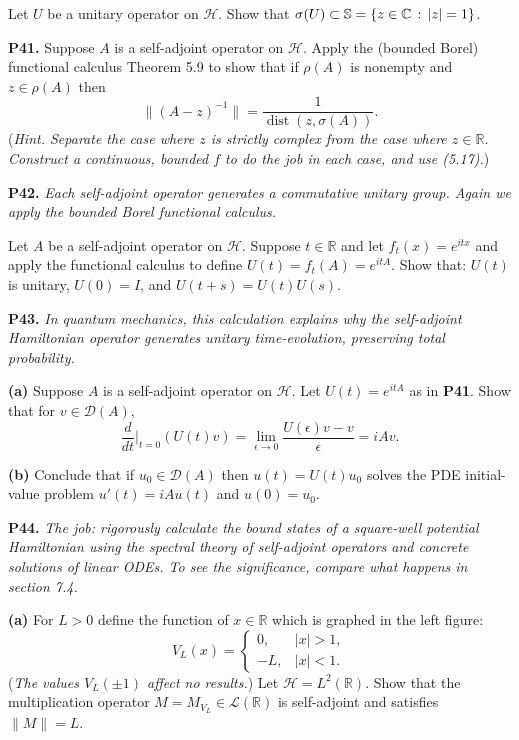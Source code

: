 \documentclass[12pt]{amsart}
\newcommand{\cD}{\mathcal{D}}
\newcommand{\cH}{\mathcal{H}}
\newcommand{\cL}{\mathcal{L}}
\newcommand{\CC}{\mathbb{C}}
\newcommand{\RR}{\mathbb{R}}
\newcommand{\eps}{\epsilon}
\newcommand{\prob}[1]{\bigskip\noindent\textbf{#1.}\quad }
\newcommand{\epart}[1]{\medskip\noindent\textbf{(#1)}\quad }
\begin{document}
\medskip\noindent Let $U$ be a unitary operator on $\cH$.  Show that $\sigma(U) \subset \SS = \{z\in\CC\,:\,|z|=1\}$.


\prob{P41}  Suppose $A$ is a self-adjoint operator on $\cH$.  Apply the (bounded Borel) functional calculus Theorem 5.9 to show that if $\rho(A)$ is nonempty and $z\in\rho(A)$ then
	$$\|(A-z)^{-1}\| = \frac{1}{\operatorname{dist}(z,\sigma(A))}.$$
(\emph{Hint. Separate the case where $z$ is strictly complex from the case where $z\in\RR$.  Construct a continuous, bounded $f$ to do the job in each case, and use (5.17).})


\clearpage\newpage
\prob{P42}  \emph{Each self-adjoint operator generates a commutative unitary group.  Again we apply the bounded Borel functional calculus.}

\medskip\noindent Let $A$ be a self-adjoint operator on $\cH$.  Suppose $t\in\RR$ and let $f_t(x) = e^{itx}$ and apply the functional calculus to define $U(t) = f_t(A) = e^{itA}$.  Show that: $U(t)$ is unitary, $U(0) = I$, and $U(t+s) = U(t) U(s)$.


\prob{P43}  \emph{In quantum mechanics, this calculation explains why the self-adjoint Hamiltonian operator generates unitary time-evolution, preserving total probability.}

\epart{a}  Suppose $A$ is a self-adjoint operator on $\cH$.  Let $U(t) = e^{itA}$ as in \textbf{P41}.  Show that for $v\in\cD(A)$,
	$$\frac{d}{dt}\Big|_{t=0} (U(t)v) = \lim_{\eps\to 0} \frac{U(\eps)v-v}{\eps} = i A v.$$

\epart{b}  Conclude that if $u_0\in\cD(A)$ then $u(t) = U(t) u_0$ solves the PDE initial-value problem $u'(t) = iAu(t)$ and $u(0)=u_0$.


\prob{P44}  \emph{The job: rigorously calculate the bound states of a square-well potential Hamiltonian using the spectral theory of self-adjoint operators and concrete solutions of linear ODEs.  To see the significance, compare what happens in section 7.4.}

\epart{a}  For $L>0$ define the function of $x\in\RR$ which is graphed in the left figure:
	$$V_L(x) = \begin{cases} 0, & |x|>1, \\ -L, & |x|<1. \end{cases}$$
(\emph{The values $V_L(\pm 1)$ affect no results.})  Let $\cH=L^2(\RR)$.  Show that the multiplication operator $M = M_{V_L}\in\cL(\RR)$ is self-adjoint and satisfies $\|M\|=L$.
\end{document}
